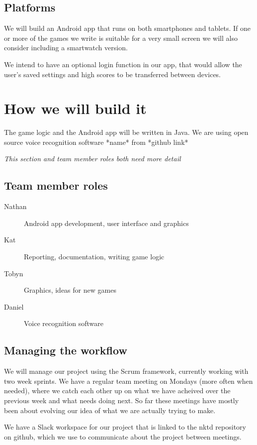 \documentclass[11pt, oneside]{article}
\begin{document}
\subsection*{Platforms}

We will build an Android app that runs on both smartphones and
tablets. If one or more of the games we write is suitable for a very
small screen we will also consider including a smartwatch version.

We intend to have an optional login function in our app, that would
allow the user's saved settings and high scores to be transferred between
devices.


\section*{How we will build it}

The game logic and the Android app will be written in Java. We are
using open source voice recognition software *name* from *github link*

{\em This section and team member roles both need more detail}

\subsection*{Team member roles}

\begin{description}
\item [Nathan] Android app development, user interface and graphics
\item [Kat] Reporting, documentation, writing game logic
\item [Tobyn] Graphics, ideas for new games
\item [Daniel] Voice recognition software
\end{description}


\subsection*{Managing the workflow}

We will manage our project using the Scrum framework, currently
working with two week sprints. We have a regular team meeting on
Mondays (more often when needed), where we catch each other up on what
we have acheived over the previous week and what needs doing next. So
far these meetings have mostly been about evolving our idea of what we
are actually trying to make.

We have a Slack workspace for our project that is linked to the nktd
repository on github, which we use to communicate about the project
between meetings.
\end{document}
